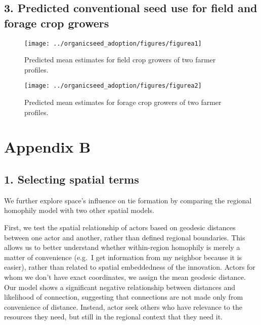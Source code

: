 \documentclass[twoside,12pt,final]{ucthesis-CA2012}
\begin{document}
\begin{ucmainmatter}
{\section{3. Predicted conventional seed use for field and forage crop growers}\label{predicted-conventional-seed-use-for-field-and-forage-crop-growers}}
\begin{figure}

{\centering \texttt{[image: ../organicseed\_adoption/figures/figurea1]} 

}

\caption{Predicted mean estimates for field crop growers of two farmer profiles.}\label{fig:unnamed-chunk-32}
\end{figure}
\begin{figure}

{\centering \texttt{[image: ../organicseed\_adoption/figures/figurea2]} 

}

\caption{Predicted mean estimates for forage crop growers of two farmer profiles.}\label{fig:unnamed-chunk-33}
\end{figure}
\hypertarget{appendix-b}{%
\chapter{Appendix B}\label{appendix-b}}

\hypertarget{selecting-spatial-terms}{%
\section{1. Selecting spatial terms}\label{selecting-spatial-terms}}

We further explore space's influence on tie formation by comparing the regional homophily model with two other spatial models.

First, we test the spatial relationship of actors based on geodesic distances between one actor and another, rather than defined regional boundaries. This allows us to better understand whether within-region homophily is merely a matter of convenience (e.g.~I get information from my neighbor because it is easier), rather than related to spatial embeddedness of the innovation. Actors for whom we don't have exact coordinates, we assign the mean geodesic distance. Our model shows a significant negative relationship between distances and likelihood of connection, suggesting that connections are not made only from convenience of distance. Instead, actor seek others who have relevance to the resources they need, but still in the regional context that they need it.
\begin{table}


\end{table}
\end{ucmainmatter}
\end{document}
